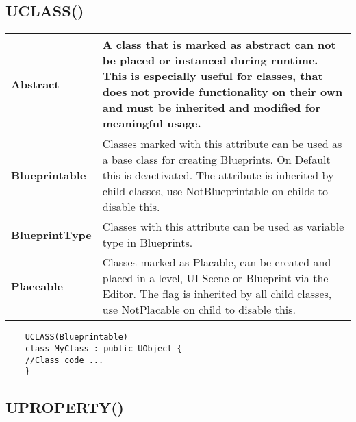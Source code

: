 \documentclass[10pt]{article}
\begin{document}
\begin{multicols*}{5}
	\subsection{UCLASS()}
	\begin{tabularx}{\columnwidth}{|l|X|}
		\hline \textbf{Abstract}
		& A class that is marked as abstract can not be placed or instanced during runtime. This is especially useful for classes, that does not provide functionality on their own and must be inherited and modified for meaningful usage.\\
		\hline \textbf{Blueprintable}
		& Classes marked with this attribute can be used as a base class for creating Blueprints. On Default this is deactivated. The attribute is inherited by child classes, use NotBlueprintable on childs to disable this. \\
		\hline \textbf{BlueprintType}
		& Classes with this attribute can be used as variable type in Blueprints. \\
		\hline \textbf{Placeable}
		& Classes marked as Placable, can be created and placed in a level, UI Scene or Blueprint via the Editor. The flag is inherited by all child classes, use NotPlacable on child to disable this. \\
		\hline
	\end{tabularx}
	
	\begin{verbatim}
	UCLASS(Blueprintable)
	class MyClass : public UObject {
	//Class code ...
	}
	\end{verbatim}
	
	\subsection{UPROPERTY()}
	
	\begin{tabularx}{\columnwidth}{|p{3.5cm}|X|}
		

\end{tabularx}
\end{multicols*}
\end{document}
